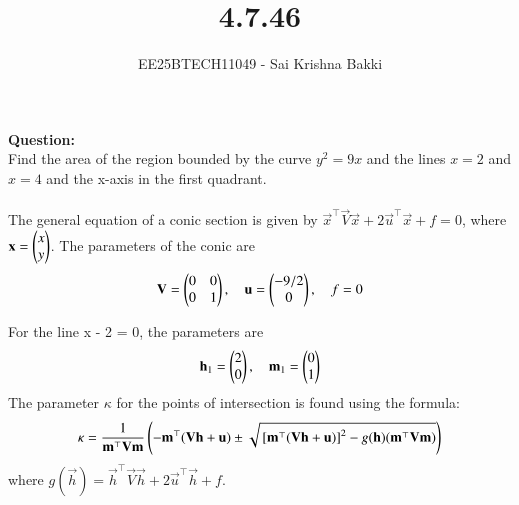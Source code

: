\documentclass[journal]{IEEEtran}
\begin{document}

\vspace{3cm}

\title{4.7.46}
\author{EE25BTECH11049 - Sai Krishna Bakki}
 \maketitle
{\let\newpage\relax\maketitle}

\renewcommand{\thefigure}{\theenumi}
\renewcommand{\thetable}{\theenumi}
\setlength{\intextsep}{10pt} %


\renewcommand{\thetable}{\theenumi}
\textbf{Question:}\\
Find the area of the region bounded by the curve $y^2 = 9x$ and the lines $x = 2$ and $x = 4$ and the x-axis in the first quadrant.\\

\solution\\
The general equation of a conic section is given by $\vec{x}^\top\vec{V}\vec{x} + 2\vec{u}^\top\vec{x} + f = 0$, where $\mathbf{x} = \begin{pmatrix}x \\ y\end{pmatrix}$.
The parameters of the conic are
\begin{align}
\mathbf{V} = \begin{pmatrix}0 & 0 \\ 0 & 1\end{pmatrix}, \quad \mathbf{u} = \begin{pmatrix}-9/2 \\ 0\end{pmatrix}, \quad f = 0
\end{align}

For the line x - 2 = 0, the parameters are
\begin{align}
\mathbf{h}_1 = \begin{pmatrix}2 \\ 0\end{pmatrix}, \quad \mathbf{m}_1 = \begin{pmatrix}0 \\ 1\end{pmatrix}
\end{align}
The parameter $\kappa$ for the points of intersection is found using the formula:
\begin{align}
\kappa = \frac{1}{\mathbf{m}^\top \mathbf{V} \mathbf{m}}\left(-\mathbf{m}^\top(\mathbf{V}\mathbf{h}+\mathbf{u}) \pm \sqrt{{}\left[\mathbf{m}^\top(\mathbf{V}\mathbf{h}+\mathbf{u})\right]^2 - g(\mathbf{h})(\mathbf{m}^\top \mathbf{V} \mathbf{m})}\right)
\end{align}
where $g(\vec{h}) = \vec{h}^\top \vec{V} \vec{h} + 2\vec{u}^\top \vec{h} + f$.
\end{document}
